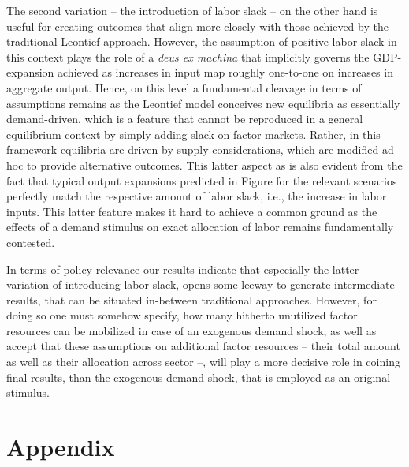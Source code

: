 \documentclass{article}
\begin{document}
The second variation -- the introduction of labor slack -- on the other hand is useful for creating outcomes that align more closely with those achieved by the traditional Leontief approach. However, the assumption of positive labor slack in this context plays the role of a \textit{deus ex machina} that implicitly governs the GDP-expansion achieved as increases in input map roughly one-to-one on increases in aggregate output. Hence, on this level a fundamental cleavage in terms of assumptions remains as the Leontief model conceives new equilibria as essentially demand-driven, which is a feature that cannot be reproduced in a general equilibrium context by simply adding slack on factor markets. Rather, in this framework equilibria are driven by supply-considerations, which are modified ad-hoc to provide alternative outcomes. This latter aspect as is also evident from the fact that typical output expansions predicted in Figure \label{fig:labour_camp} for the relevant scenarios perfectly match the respective amount of labor slack, i.e., the increase in labor inputs. This latter feature makes it hard to achieve a common ground as the effects of a demand stimulus on exact allocation of labor remains fundamentally contested.

In terms of policy-relevance our results indicate that especially the latter variation of introducing labor slack, opens some leeway to generate intermediate results, that can be situated in-between traditional approaches. However, for doing so one must somehow specify, how many hitherto unutilized factor resources can be mobilized in case of an exogenous demand shock, as well as accept that these assumptions on additional factor resources -- their total amount as well as their allocation across sector --, will play a more decisive role in coining final results, than the exogenous demand shock, that is employed as an original stimulus.

\printbibliography
\newpage
\section*{Appendix}
\end{document}
